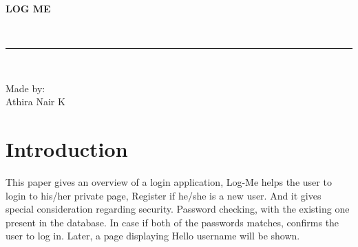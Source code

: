 \documentclass[11pt, english]{article}
\begin{document}
\begin{titlepage}

\begin{center}
\vspace*{-1in}
\begin{figure}[htb]
\begin{center}

\end{center}
\end{figure}

\begin{large}
\textbf{LOG ME}\\
\end{large}
\vspace*{0.2in}
\begin{Large}

\end{Large}
\vspace*{0.3in}
\begin{large}
\\
\end{large}
\vspace*{0.3in}
\rule{80mm}{0.1mm}\\
\vspace*{0.1in}
\begin{large}
Made by: \\
Athira Nair K\\
\end{large}

\end{center}
\end{titlepage}

\newcommand{\CC}{C\nolinebreak\hspace{-.05em}\raisebox{.4ex}{\tiny\bf +}\nolinebreak\hspace{-.10em}\raisebox{.4ex}{\tiny\bf +}}
\def\CC{{C\nolinebreak[4]\hspace{-.05em}\raisebox{.4ex}{\tiny\bf ++}}}

\tableofcontents
\newpage
\section{Introduction}
\newline
This paper gives an overview of a login application, Log-Me helps the user to login to his/her private page,  Register if he/she is a new user. And it gives special consideration regarding security. Password checking, with the existing one present in the database. In case if both of the passwords matches, confirms the user to log in. Later, a page displaying Hello username will be shown.
\end{document}
